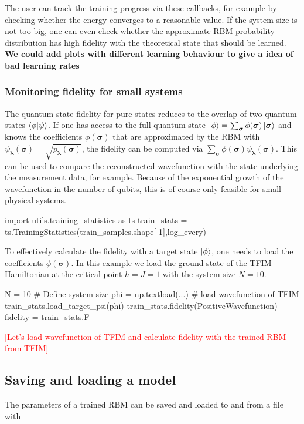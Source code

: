 \documentclass[submission, Phys]{SciPost}
\begin{document}
The user can track the training progress via these callbacks, for example by checking whether the energy converges to a reasonable value.
If the system size is not too big, one can even check whether the approximate RBM probability distribution has high fidelity with the theoretical state that should be learned.
\textbf{We could add plots with different learning behaviour to give a idea of bad learning rates}



\subsubsection{Monitoring fidelity for small systems}
The quantum state fidelity for pure states reduces to the overlap of two quantum states $\braket{\phi | \psi}$.
If one has access to the full quantum state $\ket{\phi} = \sum_{\bm{\sigma}} \phi(\bm{\sigma}) \ket{ \bm{\sigma}}$
and knows the coefficients $\phi(\bm{\sigma})$ that are approximated by the RBM with
$\psi_{\bm{\lambda}}(\bm{\sigma}) = \sqrt{p_{\bm{\lambda}}(\bm{\sigma})}$,
the fidelity can be computed via $\sum_{\bm{\sigma}} \phi(\bm{\sigma}) \psi_{\bm{\lambda}}(\bm{\sigma})$.
This can be used to compare the reconstructed wavefunction with the state underlying the measurement data, for example.
Because of the exponential growth of the wavefunction in the number of qubits, this is of course only feasible for small physical systems.
\begin{python}
    import utils.training_statistics as ts
    train_stats = ts.TrainingStatistics(train_samples.shape[-1],log_every)
\end{python}
%
To effectively calculate the fidelity with a target state $\ket{\phi}$, one needs to load the coefficients $\phi(\bm{\sigma})$. In this example we load the ground state of the TFIM Hamiltonian at the critical point $h = J = 1$ with the system size $N=10$.

\begin{python}
    N = 10 # Define system size
    phi = np.textload(...) # load wavefunction of TFIM
    train_stats.load_target_psi(phi)
    train_stats.fidelity(PositiveWavefunction)
    fidelity = train_stats.F
\end{python}

\textcolor{red}{[Let's load wavefunction of TFIM and calculate fidelity with the trained RBM from TFIM]}


\subsection{Saving and loading a model}
The parameters of a trained RBM can be saved and loaded to and from a file with
\end{document}
